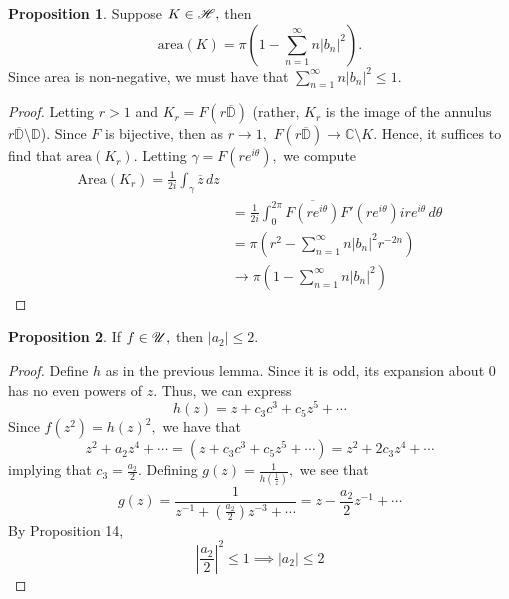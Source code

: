 \documentclass[10pt, oneside]{article}
\newcommand{\bbC}{\mathbb{C}}
\newcommand{\sm}{\setminus}
\theoremstyle{definition}
\newtheorem{prop}{Proposition}
\newcommand{\bbC}{\mathbb{C}}
\newcommand{\bbD}{\mathbb{D}}
\newcommand{\sm}{\setminus}
\begin{document}
\begin{prop}
    Suppose $K \in \cal H,$ then 
    \[\text{area}(K) = \pi(1 - \sum_{n=1}^\infty n |b_n|^2).\] Since area is non-negative, we must have that $\sum_{n=1}^\infty n |b_n|^2 \leq 1.$ 
\end{prop}
\begin{proof}
    Letting $r>1$ and $K_r = F(r\overline{\bbD})$ (rather, $K_r$ is the image of the annulus $r\overline{\bbD}\sm \bbD$). Since $F$ is bijective, then as $r\to 1,$ $F(r\overline{\bbD})\to \bbC\sm K.$ Hence, it suffices to find that $\text{area}(K_r).$ Letting $\gamma = F(re^{i\theta}),$ we compute 
    \begin{align*}
        \text{Area}(K_r) = \frac{1}{2i}\int_\gamma \overline{z} \,dz\\
        &= \frac{1}{2i}\int_{0}^{2\pi} \overline{F(re^{i\theta})}F'(re^{i\theta})ire^{i\theta}\,d\theta\\
        &= \pi(r^2 - \sum_{n=1}^\infty n |b_n|^2 r^{-2n})\\
        &\to \pi(1 - \sum_{n=1}^\infty n|b_n|^2)
    \end{align*}
\end{proof}



\begin{prop}
    If $f \in \cal U,$ then $|a_2| \leq 2.$ 
\end{prop}
\begin{proof}
    Define $h$ as in the previous lemma. Since it is odd, its expansion about $0$ has no even powers of $z.$ Thus, we can express
    \[h(z) = z + c_3 c^3 + c_5z^5 + \cdots\] Since $f(z^2) = h(z)^2,$ we have that 
    \[z^2 + a_2z^4 + \cdots = (z + c_3 c^3 + c_5z^5 + \cdots) = z^2 + 2c_3z^4 + \cdots\] implying that $c_3 = \frac{a_2}{2}.$ Defining $g(z) = \frac{1}{h(\frac{1}{z})},$ we see that 
    \[g(z) = \frac{1}{z^{-1} + (\frac{a_2}{2})z^{-3} + \cdots} = z - \frac{a_2}{2}z^{-1} + \cdots \]
    By Proposition 14, 
    \[|\frac{a_2}{2}|^2 \leq 1 \implies |a_2| \leq 2\]
\end{proof}
\end{document}
